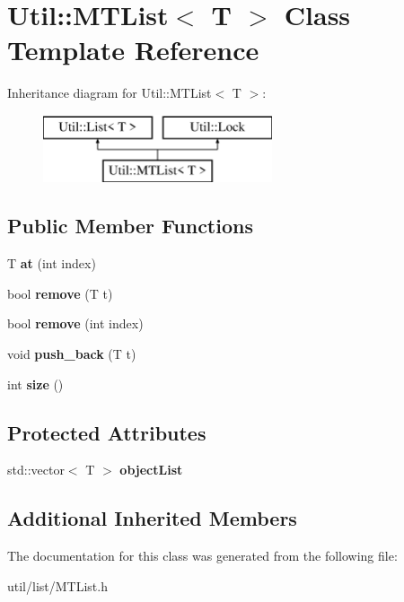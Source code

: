 \hypertarget{class_util_1_1_m_t_list}{}\section{Util\+:\+:M\+T\+List$<$ T $>$ Class Template Reference}
\label{class_util_1_1_m_t_list}
Inheritance diagram for Util\+:\+:M\+T\+List$<$ T $>$\+:\begin{figure}[H]
\begin{center}
\leavevmode
\includegraphics[height=2.000000cm]{class_util_1_1_m_t_list}
\end{center}
\end{figure}
\subsection*{Public Member Functions}
\begin{DoxyCompactItemize}
\item 
\mbox{\label{class_util_1_1_m_t_list_a7e1566aab4a9ad96040f3b3f01497f1f}} 
T {\bfseries at} (int index)
\item 
\mbox{\label{class_util_1_1_m_t_list_ab11f67bde61e13b40e335cec141a16ce}} 
bool {\bfseries remove} (T t)
\item 
\mbox{\label{class_util_1_1_m_t_list_a5d23f7ee870b82e5be693816f0db59c6}} 
bool {\bfseries remove} (int index)
\item 
\mbox{\label{class_util_1_1_m_t_list_a383ad763ad7921b72d3325e277f0c6ac}} 
void {\bfseries push\+\_\+back} (T t)
\item 
\mbox{\label{class_util_1_1_m_t_list_a98e0fb5c481e40f8f251e94b0705f880}} 
int {\bfseries size} ()
\end{DoxyCompactItemize}
\subsection*{Protected Attributes}
\begin{DoxyCompactItemize}
\item 
\mbox{\label{class_util_1_1_m_t_list_abfaba74b7870494e8b4d8670b6ed7712}} 
std\+::vector$<$ T $>$ {\bfseries object\+List}
\end{DoxyCompactItemize}
\subsection*{Additional Inherited Members}


The documentation for this class was generated from the following file\+:\begin{DoxyCompactItemize}
\item 
util/list/M\+T\+List.\+h\end{DoxyCompactItemize}
